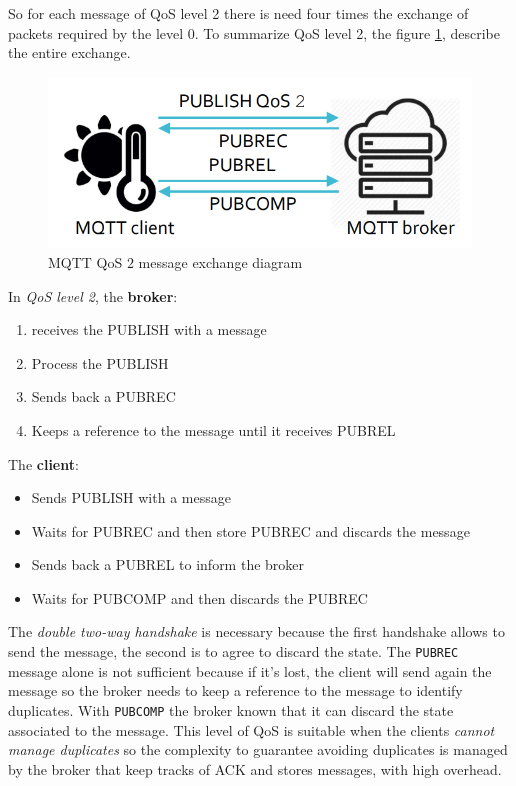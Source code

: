 \documentclass[10pt,a4paper]{report}
\theoremstyle{definition}
\begin{document}
So for each message of QoS level 2 there is need four times the exchange of packets required by the level 0.
To summarize QoS level 2, the figure \ref{mqtt-qos-2}, describe the entire exchange.
\begin{figure}[h]
	\centering
	\includegraphics[scale=0.50]{images/Pasted image 20230304093804.png}
	\caption{MQTT QoS $2$ message exchange diagram}\label{mqtt-qos-2}\end{figure}

In \textit{QoS level 2}, the \textbf{broker}:
\begin{enumerate}
	\item 
	receives the PUBLISH with a message
	\item 
	Process the PUBLISH
	\item 
	Sends back a PUBREC
	\item 
	Keeps a reference to the message until it receives PUBREL
\end{enumerate}

The \textbf{client}:
\begin{itemize}
	\item 
Sends PUBLISH with a message
\item 
Waits for PUBREC and then store PUBREC and discards the message
\item 
Sends back a PUBREL to inform the broker
\item 
Waits for PUBCOMP and then discards the PUBREC	
\end{itemize}



The \textit{double two-way handshake} is necessary because the first handshake allows to send the message, the second is to agree to discard the state. The \texttt{PUBREC} message alone is not sufficient because if it's lost, the client will send again the message so the broker needs to keep a reference to the message to identify duplicates. With \texttt{PUBCOMP} the broker known that it can discard the state associated to the message.
This level of QoS is suitable when the clients \textit{cannot manage duplicates} so the complexity to guarantee avoiding duplicates is managed by the broker that keep tracks of ACK and stores messages, with high overhead.
\end{document}

